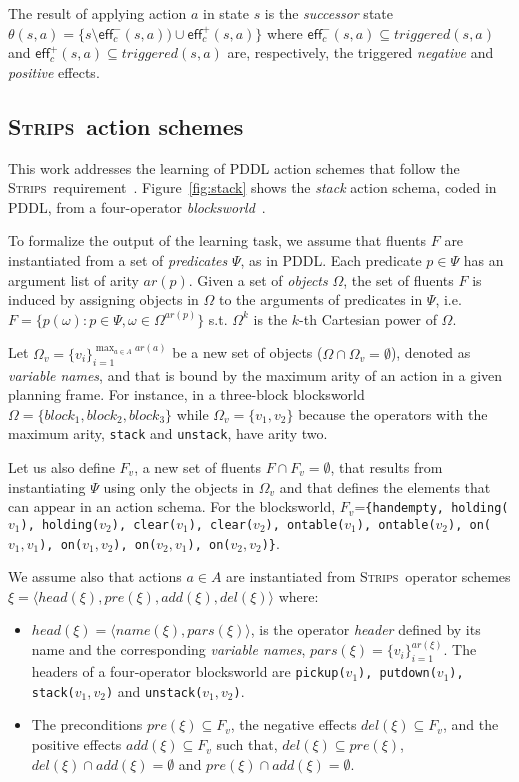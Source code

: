 \documentclass{article}
\newcommand{\tup}[1]{{\langle #1 \rangle}}
\newcommand{\eff}{\mathsf{eff}}     %
\newcommand{\strips}{\textsc{Strips}}     %
\begin{document}
The result of applying action $a$ in state $s$ is the {\em successor} state $\theta(s,a)=\{s\setminus\eff_c^-(s,a))\cup\eff_c^+(s,a)\}$ where $\eff_c^-(s,a)\subseteq triggered(s,a)$ and $\eff_c^+(s,a)\subseteq triggered(s,a)$ are, respectively, the triggered {\em negative} and {\em positive} effects.


\subsection{\strips\ action schemes}
This work addresses the learning of PDDL action schemes that follow the \strips\ requirement~\cite{mcdermott1998pddl,fox2003pddl2}. Figure~\ref{fig:stack} shows the {\em stack} action schema, coded in PDDL, from a four-operator {\em blocksworld}~\cite{slaney2001blocks}.

To formalize the output of the learning task, we assume that fluents $F$ are instantiated from a set of {\em predicates} $\Psi$, as in PDDL. Each predicate $p\in\Psi$ has an argument list of arity $ar(p)$. Given a set of {\em objects} $\Omega$, the set of fluents $F$ is induced by assigning objects in $\Omega$ to the arguments of predicates in $\Psi$, i.e.~$F=\{p(\omega):p\in\Psi,\omega\in\Omega^{ar(p)}\}$ s.t. $\Omega^k$ is the $k$-th Cartesian power of $\Omega$.

Let $\Omega_v=\{v_i\}_{i=1}^{\operatorname*{max}_{a\in A} ar(a)}$ be a new set of objects ($\Omega\cap\Omega_v=\emptyset$), denoted as {\em variable names}, and that is bound by the maximum arity of an action in a given planning frame. For instance, in a three-block blocksworld $\Omega=\{block_1, block_2, block_3\}$ while $\Omega_v=\{v_1, v_2\}$ because the operators with the maximum arity, {\small\tt stack} and {\small\tt unstack}, have arity two.

Let us also define $F_v$, a new set of fluents $F\cap F_v=\emptyset$, that results from instantiating $\Psi$ using only the objects in $\Omega_v$ and that defines the elements that can appear in an action schema. For the blocksworld, $F_v$={\small\tt\{handempty, holding($v_1$), holding($v_2$), clear($v_1$), clear($v_2$), ontable($v_1$), ontable($v_2$), on($v_1,v_1$), on($v_1,v_2$), on($v_2,v_1$), on($v_2,v_2$)\}}.

We assume also that actions $a\in A$ are instantiated from \strips\ operator schemes $\xi=\tup{head(\xi),pre(\xi),add(\xi),del(\xi)}$ where:
\begin{itemize}
\item $head(\xi)=\tup{name(\xi),pars(\xi)}$, is the operator {\em header} defined by its name and the corresponding {\em variable names}, $pars(\xi)=\{v_i\}_{i=1}^{ar(\xi)}$. The headers of a four-operator blocksworld are {\small\tt pickup($v_1$), putdown($v_1$), stack($v_1,v_2$)} and {\small\tt unstack($v_1,v_2$)}.
\item The preconditions $pre(\xi)\subseteq F_v$, the negative effects $del(\xi)\subseteq F_v$, and the positive effects $add(\xi)\subseteq F_v$ such that, $del(\xi)\subseteq pre(\xi)$, $del(\xi)\cap add(\xi)=\emptyset$ and $pre(\xi)\cap add(\xi)=\emptyset$.
\end{itemize}
\end{document}
